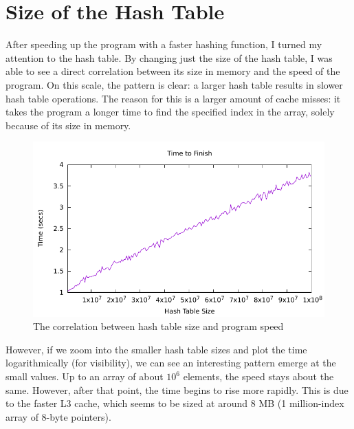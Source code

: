 \documentclass[12pt]{article}
\begin{document}
\section{Size of the Hash Table}
After speeding up the program with a faster hashing function, I turned my attention to the hash table. By changing just the size of the hash table, I was able to see a direct correlation between its size in memory and the speed of the program. On this scale, the pattern is clear: a larger hash table results in slower hash table operations. The reason for this is a larger amount of cache misses: it takes the program a longer time to find the specified index in the array, solely because of its size in memory.

\begin{figure}[H]\begin{centering}
\includegraphics{plots/big-ht-time.pdf}\caption{The correlation between hash table size and program speed}
\end{centering}\end{figure}

However, if we zoom into the smaller hash table sizes and plot the time logarithmically (for visibility), we can see an interesting pattern emerge at the small values. Up to an array of about $10^6$ elements, the speed stays about the same. However, after that point, the time begins to rise more rapidly. This is due to the faster L3 cache, which seems to be sized at around 8 MB (1 million-index array of 8-byte pointers).
\end{document}
